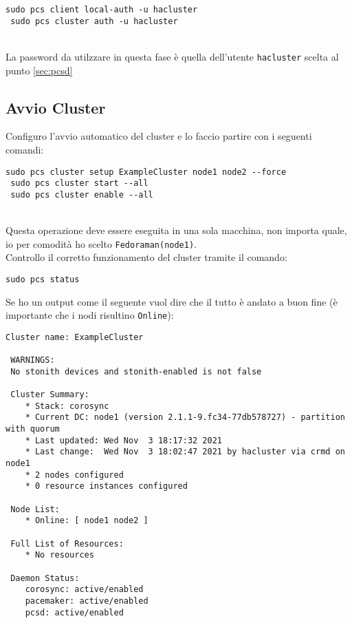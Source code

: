 \begin{lstlisting}[style=cmd]
 sudo pcs client local-auth -u hacluster
 sudo pcs cluster auth -u hacluster
\end{lstlisting}
\ \\
La password da utilzzare in questa fase \`{e} quella dell'utente \lstinline[style=cmd]|hacluster| scelta al punto \autoref{sec:pcsd}

\subsection{Avvio Cluster}

Configuro l'avvio automatico del cluster e lo faccio partire con i seguenti comandi:

\begin{lstlisting}[style=cmd]
 sudo pcs cluster setup ExampleCluster node1 node2 --force
 sudo pcs cluster start --all
 sudo pcs cluster enable --all
\end{lstlisting}
\ \\
Questa operazione deve essere eseguita in una sola macchina, non importa quale, io per comodit\`{a} ho scelto \lstinline[style=cmd]|Fedoraman(node1)|.
\ \\
Controllo il corretto funzionamento del cluster tramite il comando:

\begin{lstlisting}[style=cmd]
 sudo pcs status
\end{lstlisting}
\pagebreak
Se ho un output come il seguente vuol dire che il tutto \`{e} andato a buon fine (\`{e} importante che i nodi risultino \lstinline[style=cmd]|Online|):

\begin{lstlisting}[style=output]
 Cluster name: ExampleCluster
 
 WARNINGS:
 No stonith devices and stonith-enabled is not false
 
 Cluster Summary:
    * Stack: corosync
    * Current DC: node1 (version 2.1.1-9.fc34-77db578727) - partition with quorum
    * Last updated: Wed Nov  3 18:17:32 2021
    * Last change:  Wed Nov  3 18:02:47 2021 by hacluster via crmd on node1
    * 2 nodes configured
    * 0 resource instances configured
 
 Node List:
    * Online: [ node1 node2 ]
 
 Full List of Resources:
    * No resources
 
 Daemon Status:
    corosync: active/enabled
    pacemaker: active/enabled
    pcsd: active/enabled
\end{lstlisting}

